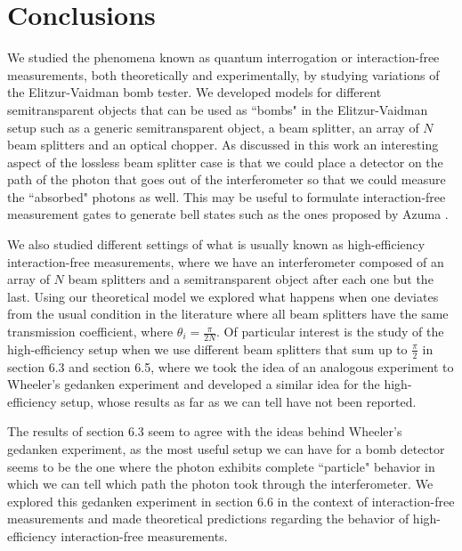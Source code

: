 \documentclass[12pt]{book}
\begin{document}
\chapter*{Conclusions}
\thispagestyle{plain}
We studied the phenomena known as quantum interrogation or interaction-free measurements, both theoretically and experimentally, by studying variations of the Elitzur-Vaidman bomb tester. We developed models for different semitransparent objects that can be used as ``bombs" in the Elitzur-Vaidman setup such as a generic semitransparent object, a beam splitter, an array of $N$ beam splitters and an optical chopper. As discussed in this work an interesting aspect of the lossless beam splitter case is that we could place a detector on the path of the photon that goes out of the interferometer so that we could measure the ``absorbed" photons as well. This may be useful to formulate interaction-free measurement gates to generate bell states such as the ones proposed by Azuma \cite{computacion}.

We also studied different settings of what is usually known as high-efficiency interaction-free measurements, where we have an interferometer composed of an array of $N$ beam splitters and a semitransparent object after each one but the last. Using our theoretical model we explored what happens when one deviates from the usual condition in the literature where all beam splitters have the same transmission coefficient, where  $\theta_{i}=\frac{\pi}{2N}$. Of particular interest is the study of the high-efficiency setup when we use different beam splitters that sum up to $\frac{\pi}{2}$ in section 6.3 and section 6.5, where we took the idea of an analogous experiment to Wheeler's gedanken experiment \cite{azuri} and developed a similar idea for the high-efficiency setup, whose results as far as we can tell have not been reported.

The results of section 6.3 seem to agree with the ideas behind Wheeler's gedanken experiment, as the most useful setup we can have for a bomb detector seems to be the one where the photon exhibits complete ``particle" behavior in which we can tell which path the photon took through the interferometer. We explored this gedanken experiment in section 6.6 in the context of interaction-free measurements and made theoretical predictions regarding the behavior of high-efficiency interaction-free measurements.
\end{document}
